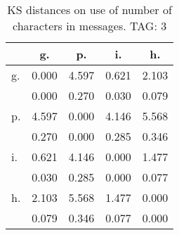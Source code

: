 \begin{table}[h!]
\begin{center}
\begin{tabular}{| l | c | c | c | c |}\hline
 & g. & p. & i. & h. \\\hline
g. & 0.000  & 4.597  & 0.621  & 2.103 \\\hline
 & 0.000  & 0.270  & 0.030  & 0.079 \\\hline
p. & 4.597  & 0.000  & 4.146  & 5.568 \\\hline
 & 0.270  & 0.000  & 0.285  & 0.346 \\\hline
i. & 0.621  & 4.146  & 0.000  & 1.477 \\\hline
 & 0.030  & 0.285  & 0.000  & 0.077 \\\hline
h. & 2.103  & 5.568  & 1.477  & 0.000 \\\hline
 & 0.079  & 0.346  & 0.077  & 0.000 \\\hline
\end{tabular}
\caption{KS distances on use of number of characters in messages. TAG: 3}
\end{center}
\end{table}